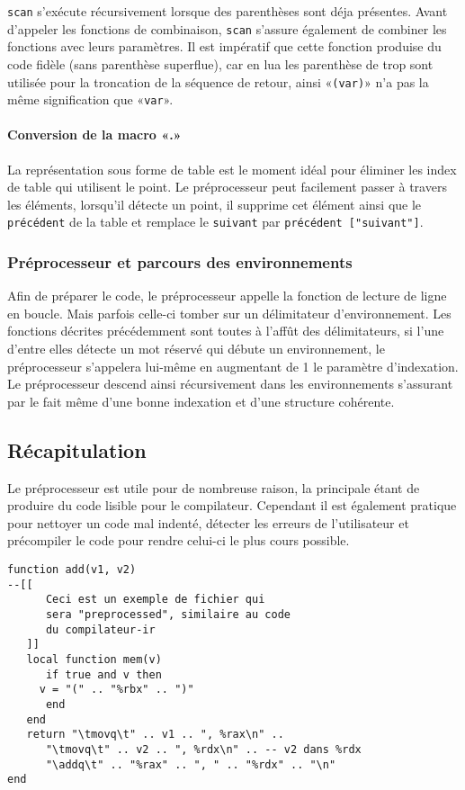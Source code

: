 \documentclass{article}
\begin{document}
\texttt{scan} s'exécute récursivement lorsque des parenthèses sont déja présentes. Avant d'appeler les fonctions de combinaison, \texttt{scan} s'assure également de combiner les fonctions avec leurs paramètres. Il est impératif que cette fonction produise du code fidèle (sans parenthèse superflue), car en lua les parenthèse de trop sont utilisée pour la troncation de la séquence de retour, ainsi «\texttt{(var)}» n'a pas la même signification que «\texttt{var}».

\paragraph{Conversion de la macro «.»}
La représentation sous forme de table est le moment idéal pour éliminer les index de table qui utilisent le point. Le préprocesseur peut facilement passer à travers les éléments, lorsqu'il détecte un point, il supprime cet élément ainsi que le \texttt{précédent} de la table et remplace le \texttt{suivant} par \texttt{précédent ["suivant"]}.

\subsubsection{Préprocesseur et parcours des environnements}
Afin de préparer le code, le préprocesseur appelle la fonction de lecture de ligne en boucle. Mais parfois celle-ci tomber sur un délimitateur d'environnement. Les fonctions décrites précédemment sont toutes à l'affût des délimitateurs, si l'une d'entre elles détecte un mot réservé qui débute un environnement, le préprocesseur s'appelera lui-même en augmentant de 1 le paramètre d'indexation. Le préprocesseur descend ainsi récursivement dans les environnements s'assurant par le fait même d'une bonne indexation et d'une structure cohérente.

\subsection{Récapitulation}
Le préprocesseur est utile pour de nombreuse raison, la principale étant de produire du code lisible pour le compilateur. Cependant il est également pratique pour nettoyer un code mal indenté, détecter les erreurs de l'utilisateur et précompiler le code pour rendre celui-ci le plus cours possible.

\begin{lstlisting}[caption={Récapitulatif des fonctionnalitées},label=DescriptiveLabel, belowcaptionskip = -0.8\baselineskip]
function add(v1, v2)
--[[ 
      Ceci est un exemple de fichier qui 
      sera "preprocessed", similaire au code
      du compilateur-ir
   ]]
   local function mem(v)
      if true and v then
	 v = "(" .. "%rbx" .. ")"
      end
   end
   return "\tmovq\t" .. v1 .. ", %rax\n" ..
      "\tmovq\t" .. v2 .. ", %rdx\n" .. -- v2 dans %rdx
      "\addq\t" .. "%rax" .. ", " .. "%rdx" .. "\n"
end
\end{lstlisting}
\end{document}
